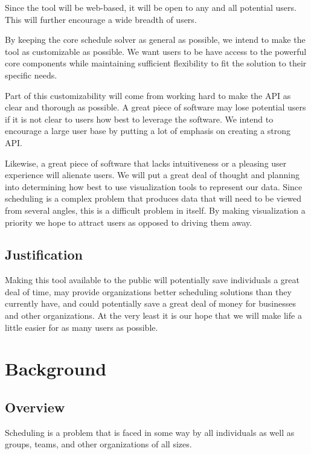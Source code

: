 \documentclass{extarticle}
\begin{document}
Since the tool will be web-based, it will be open to any and all potential users.  This will further encourage a
wide breadth of users.

By keeping the core schedule solver as general as possible, we intend to make the tool as customizable as possible.
We want users to be have access to the powerful core components while maintaining sufficient flexibility to fit the
solution to their specific needs.

Part of this customizability will come from working hard to make the API as clear and thorough as possible.  A
great piece of software may lose potential users if it is not clear to users how best to leverage the software.  We
intend to encourage a large user base by putting a lot of emphasis on creating a strong API.

Likewise, a great piece of software that lacks intuitiveness or a pleasing user experience will alienate users.
We will put a great deal of thought and planning into determining how best to use visualization tools to represent
our data.  Since scheduling is a complex problem that produces data that will need to be viewed from several angles,
this is a difficult problem in itself.  By making visualization a priority we hope to attract users as opposed to
driving them away.

\subsection{Justification}
Making this tool available to the public will potentially save individuals a great deal of time, may provide
organizations better scheduling solutions than they currently have, and could potentially save a great deal
of money for businesses and other organizations.  At the very least it is our hope that we will make life a little
easier for as many users as possible.

\section{Background}

\subsection{Overview} %
Scheduling is a problem that is faced in some way by all individuals as well as groups, teams, and other
organizations of all sizes.  
\end{document}
